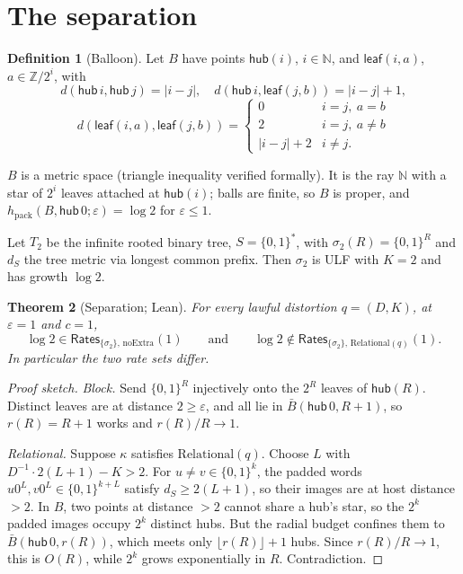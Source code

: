 \documentclass[11pt,a4paper]{article}
\theoremstyle{plain}
\newtheorem{theorem}{Theorem}
\theoremstyle{definition}
\newtheorem{definition}[theorem]{Definition}
\theoremstyle{remark}
\newcommand{\Rates}{\mathsf{Rates}}
\newcommand{\hpack}{h_{\mathrm{pack}}}
\begin{document}
\section{The separation}

\begin{definition}[Balloon]
Let $B$ have points $\mathsf{hub}(i)$, $i\in\mathbb{N}$, and
$\mathsf{leaf}(i,a)$, $a \in \mathbb{Z}/2^i$, with
\[
 d(\mathsf{hub}\,i,\mathsf{hub}\,j)=|i-j|,\quad
 d(\mathsf{hub}\,i,\mathsf{leaf}(j,b))=|i-j|+1,
\]
\[
 d(\mathsf{leaf}(i,a),\mathsf{leaf}(j,b))=
 \begin{cases} 0 & i=j,\ a=b\\ 2 & i=j,\ a\ne b\\ |i-j|+2 & i\ne j.\end{cases}
\]
\end{definition}

$B$ is a metric space (triangle inequality verified formally). It is the ray
$\mathbb{N}$ with a star of $2^i$ leaves attached at $\mathsf{hub}(i)$; balls
are finite, so $B$ is proper, and $\hpack(B,\mathsf{hub}\,0;\varepsilon)=\log 2$
for $\varepsilon\le 1$.

Let $T_2$ be the infinite rooted binary tree, $S=\{0,1\}^{*}$, with
$\sigma_2(R)=\{0,1\}^R$ and $d_S$ the tree metric via longest common prefix.
Then $\sigma_2$ is ULF with $K=2$ and has growth $\log 2$.

\begin{theorem}[Separation; Lean]\label{thm:sep}
For every lawful distortion $q=(D,K)$, at $\varepsilon=1$ and $c=1$,
\[
 \log 2 \in \Rates_{\{\sigma_2\},\,\mathrm{noExtra}}(1)
 \qquad\text{and}\qquad
 \log 2 \notin \Rates_{\{\sigma_2\},\,\mathrm{Relational}(q)}(1).
\]
In particular the two rate sets differ.
\end{theorem}

\begin{proof}[Proof sketch]
\emph{Block.} Send $\{0,1\}^R$ injectively onto the $2^R$ leaves of
$\mathsf{hub}(R)$. Distinct leaves are at distance $2\ge\varepsilon$, and all
lie in $\bar B(\mathsf{hub}\,0,R+1)$, so $r(R)=R+1$ works and $r(R)/R\to 1$.

\emph{Relational.} Suppose $\kappa$ satisfies $\mathrm{Relational}(q)$. Choose
$L$ with $D^{-1}\cdot 2(L+1)-K > 2$. For $u\ne v\in\{0,1\}^k$, the padded words
$u0^L, v0^L \in \{0,1\}^{k+L}$ satisfy $d_S \ge 2(L+1)$, so their images are at
host distance $>2$. In $B$, two points at distance $>2$ cannot share a hub's
star, so the $2^k$ padded images occupy $2^k$ distinct hubs. But the radial
budget confines them to $\bar B(\mathsf{hub}\,0,r(R))$, which meets only
$\lfloor r(R)\rfloor+1$ hubs. Since $r(R)/R\to 1$, this is $O(R)$, while
$2^k$ grows exponentially in $R$. Contradiction.
\end{proof}
\end{document}
